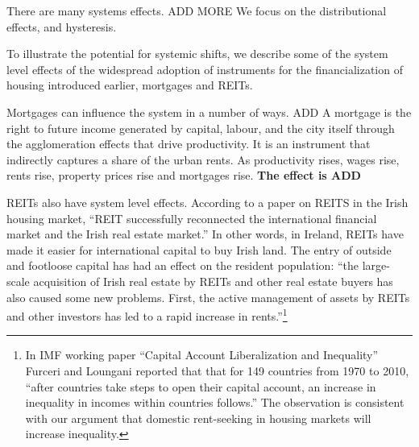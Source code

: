 There are many systems effects. ADD MORE %
We focus on the distributional effects, and hysteresis.

To illustrate the potential for systemic shifts, we describe some of the system level effects of the widespread adoption of instruments for the financialization of housing introduced earlier, mortgages and REITs. 

Mortgages can influence the system in a number of ways. ADD %
A mortgage is the right to future income generated by capital, labour, and the city itself through the agglomeration effects that drive productivity. It is an instrument that indirectly captures a share of the urban rents. As productivity rises, wages rise, rents rise, property prices rise and mortgages rise. \textbf{The effect is ADD}

REITs also have system level effects. %
According to a paper \cite{wangAnalyzeImpactREITs2021} on REITS in the Irish housing market, ``REIT successfully reconnected the international financial market and the Irish real estate market.'' In other words, in Ireland, REITs have made it easier for international capital to buy Irish land. The entry of outside and footloose capital has had an effect on the resident population:  ``the large-scale acquisition of Irish real estate by REITs and other real estate buyers has also caused some new problems. First, the active management of assets by REITs and other investors has led to a rapid increase in rents.''\footnote{In  IMF working paper ``Capital Account Liberalization and Inequality'' \cite{furceriCapitalAccountLiberalization2015}  Furceri and Loungani reported that that for 149 countries from 1970 to 2010, ``after countries take steps to open their capital account, an increase in inequality in incomes within countries follows.'' The observation is consistent with our argument  that domestic \gls{rent-seeking} in housing markets will increase inequality.}  

